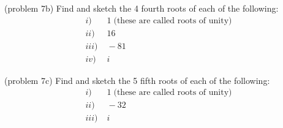 \documentclass[handout]{ximera}
\begin{document}
\begin{problem}(problem 7b)
Find and sketch the 4 fourth roots of each of the following:\\
\begin{align*}
i) &\; 1 \; \mbox{(these are called roots of unity)} \\
ii)&\; 16 \\
iii) &\; -81 \\
iv) & \;i
\end{align*}
\end{problem}

\begin{problem}(problem 7c)
Find and sketch the 5 fifth roots of each of the following:\\
\begin{align*}
i) & \;1 \; \mbox{(these are called roots of unity)} \\
ii)& \;-32 \\
iii) & \;i
\end{align*}
\end{problem}
\end{document}
